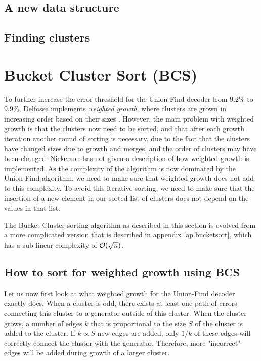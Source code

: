 \subsection{A new data structure}

\subsection{Finding clusters}

\section{Bucket Cluster Sort (BCS)}\label{sec:bucketclustersort}
To further increase the error threshold for the Union-Find decoder from $9.2\%$ to $9.9\%$, Delfosse implements \emph{weighted growth}, where clusters are grown in increasing order based on their sizes \cite{delfosse2017almost}. However, the main problem with weighted growth is that the clusters now need to be sorted, and that after each growth iteration another round of sorting is necessary, due to the fact that the clusters have changed sizes due to growth and merges, and the order of clusters may have been changed. Nickerson has not given a description of how weighted growth is implemented. As the complexity of the algorithm is now dominated by the Union-Find algorithm, we need to make sure that weighted growth does not add to this complexity. To avoid this iterative sorting, we need to make sure that the insertion of a new element in our sorted list of clusters does not depend on the values in that list.

The Bucket Cluster sorting algorithm as described in this section is evolved from a more complicated version that is described in appendix \ref{ap.bucketsort}, which has a sub-linear complexity of $\mathcal{O}(\sqrt{n})$.

\subsection{How to sort for weighted growth using BCS}

Let us now first look at what weighted growth for the Union-Find decoder exactly does. When a cluster is odd, there exists at least one path of errors connecting this cluster to a generator outside of this cluster. When the cluster grows, a number of edges $k$ that is proportional to the size $S$ of the cluster is added to the cluster. If $k \propto S$ new edges are added, only $1/k$ of these edges will correctly connect the cluster with the generator. Therefore, more "incorrect" edges will be added during growth of a larger cluster.

